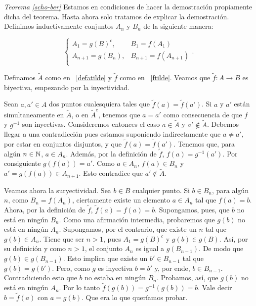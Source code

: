 \vspace{10pt}
\begin{demo}\emph{Teorema \ref{scho-ber}} Estamos en condiciones de hacer la demostración propiamente
dicha del teorema. Hasta ahora solo tratamos de explicar la
demostración. Definimos inductivamente conjuntos $A_n$ y $B_n$
de la siguiente manera:

\[\left\{%
\begin{array}{ll}
    A_1=g(B)^c, & B_1=f(A_1) \\
    A_{n+1}=g(B_n), & B_{n+1}=f(A_{n+1}) \\
\end{array}%
\right..\]

Definamos $\tilde{A}$  como en ~\eqref{defatilde} y $\tilde{f}$
como en ~\eqref{ftilde}. Veamos que $\tilde{f}:A\longrightarrow B$
es biyectiva, empezando por la inyectividad.

Sean $a,a'\in A$ dos puntos cualesquiera tales que
$\tilde{f}(a)=\tilde{f}(a')$. Si $a$ y $a'$ están
simultaneamente en $\tilde{A}$, o en $\tilde{A}^c$, tenemos que
$a=a'$ como consecuencia de que $f$ y $g^{-1}$ son inyectivas.
Consideremos entonces el caso $a\in\tilde{A}$ y $a'\notin
\tilde{A}$. Debemos llegar a una contradicción pues estamos
suponiendo indirectamente que $a\neq a'$, por estar en conjuntos
disjuntos, y que $\tilde{f}(a)=\tilde{f}(a')$. Tenemos que, para
algún $n\in\mathbb{N}$, $a\in A_n$. Además, por la definición de
$\tilde{f}$,  $f(a)=g^{-1}(a')$. Por consiguiente
$g(f(a))=a'$. Como $a\in A_n$, $f(a)\in B_n$ y $a'=g(f(a))\in
A_{n+1}$. Esto contradice que $a'\notin\tilde{A}$.

Veamos ahora la suryectividad. Sea $b\in B$ cualquier punto. Si
$b\in B_n$, para algún $n$, como $B_n=f(A_n)$, ciertamente
existe un elemento $a\in A_n$ tal que $f(a)=b$. Ahora, por la
definición de $\tilde{f}$, $\tilde{f}(a)=f(a)=b$. Supongamos,
pues, que $b$ no está en ningún $B_n$. Como una afirmación
intermedia, probaremos que $g(b)$ no está en ningún $A_n$.
Supongamos, por el contrario, que existe un $n$ tal que $g(b)\in
A_n$. Tiene que ser $n>1$, pues $A_1=g(B)^c$ y $g(b)\in g(B)$.
Así, por su definición  y como $n>1$, el conjunto $A_n$ es
igual a $g(B_{n-1})$. De modo que $g(b)\in g(B_{n-1})$. Esto
implica que existe un $b'\in B_{n-1}$ tal que $g(b)=g(b')$. Pero,
como $g$ es inyectiva $b=b'$ y, por ende, $b\in B_{n-1}$.
Contradiciendo esto que $b$ no estaba en ningún $B_n$. Probamos,
así, que $g(b)$ no está en ningún $A_n$. Por lo tanto
$\tilde{f}(g(b))=g^{-1}(g(b))=b$. Vale decir $b=\tilde{f}(a)$ con
$a=g(b)$. Que era lo que queríamos probar.
\end{demo}

